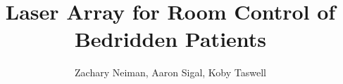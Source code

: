 \documentclass[]{article}
\title{Laser Array for Room Control of Bedridden Patients}
\author{Zachary Neiman, Aaron Sigal, Koby Taswell}
\begin{document}
\maketitle

\begin{abstract}

\end{abstract}

\section{}
\end{document}
